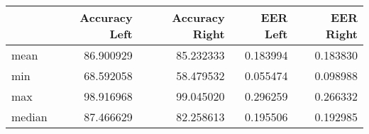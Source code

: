 \begin{tabular}{lrrrr}
\toprule
{} &  Accuracy Left &  Accuracy Right &  EER Left &  EER Right \\
\midrule
mean   &      86.900929 &       85.232333 &  0.183994 &   0.183830 \\
min    &      68.592058 &       58.479532 &  0.055474 &   0.098988 \\
max    &      98.916968 &       99.045020 &  0.296259 &   0.266332 \\
median &      87.466629 &       82.258613 &  0.195506 &   0.192985 \\
\bottomrule
\end{tabular}
